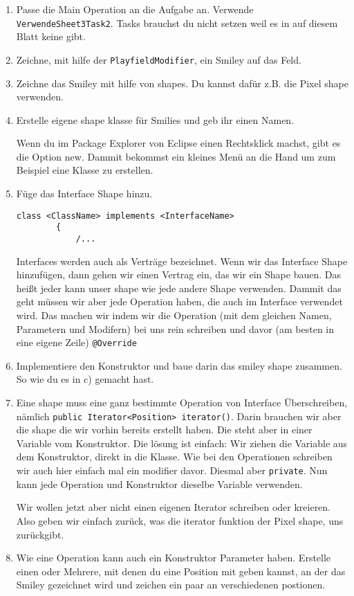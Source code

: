 \begin{enumerate}
    \item Passe die Main Operation an die Aufgabe an. Verwende \lstinline{VerwendeSheet3Task2}. Tasks brauchst du nicht setzen weil es in auf diesem Blatt keine gibt.
    \item Zeichne, mit hilfe der \lstinline{PlayfieldModifier}, ein Smiley auf das Feld. %
    \item Zeichne das Smiley mit hilfe von shapes. Du kannst dafür z.B. die Pixel shape verwenden.
    \item Erstelle eigene shape klasse für Smilies und geb ihr einen Namen.
    \begin{Infobox}
        Wenn du im Package Explorer von Eclipse einen Rechtsklick machst, gibt es die Option new.
        Dammit bekommst ein kleines Menü an die Hand um zum Beispiel eine Klasse zu erstellen.
    \end{Infobox}
    \item Füge das Interface Shape hinzu.
    \begin{lstlisting}[title=Interface Syntax,frame=ltr]
        class <ClassName> implements <InterfaceName>
        {
            /...
    \end{lstlisting}
    \begin{Infobox}[Interface]
        Interfaces werden auch als Verträge bezeichnet.
        Wenn wir das Interface Shape hinzufügen, dann gehen wir einen Vertrag ein, das wir ein Shape bauen.
        Das heißt jeder kann unser shape wie jede andere Shape verwenden.
        Dammit das geht müssen wir aber jede Operation haben, die auch im Interface verwendet wird.
        Das machen wir indem wir die Operation (mit dem gleichen Namen, Parametern und Modifern) bei uns rein schreiben und davor (am besten in eine eigene Zeile) \lstinline{@Override}
    \end{Infobox}    
    \item Implementiere den Konstruktor und baue darin das smiley shape zusammen. So wie du es in c) gemacht hast.
    \item Eine shape muss eine ganz bestimmte Operation von Interface Überschreiben, nämlich \lstinline{public Iterator<Position> iterator()}.
    Darin brauchen wir aber die shape die wir vorhin bereits erstellt haben.
    Die steht aber in einer Variable vom Konstruktor.
    Die lösung ist einfach: Wir ziehen die Variable aus dem Konstruktor, direkt in die Klasse.
    Wie bei den Operationen schreiben wir auch hier einfach mal ein modifier davor. Diesmal aber \lstinline{private}.
    Nun kann jede Operation und Konstruktor dieselbe Variable verwenden.

    Wir wollen jetzt aber nicht einen eigenen Iterator schreiben oder kreieren. Also geben wir einfach zurück, was die iterator funktion der Pixel shape, uns zurückgibt.
    \item Wie eine Operation kann auch ein Konstruktor Parameter haben.
    Erstelle einen oder Mehrere, mit denen du eine Position mit geben kannst, an der das Smiley gezeichnet wird
    und zeichen ein paar an verschiedenen postionen.
\end{enumerate}

\newpage
